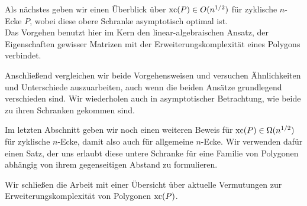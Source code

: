 Als nächstes geben wir einen Überblick über $\operatorname{xc}(P) \in O(n^{1/2})$ für zyklische $n$-Ecke $P$, wobei diese obere Schranke asymptotisch optimal ist.\\
Das Vorgehen benutzt hier im Kern den linear-algebraischen Ansatz, der Eigenschaften gewisser Matrizen mit der Erweiterungskomplexität eines Polygons verbindet. 

Anschließend vergleichen wir beide Vorgehensweisen und versuchen Ähnlichkeiten und Unterschiede auszuarbeiten, auch wenn die beiden Ansätze grundlegend verschieden sind. Wir wiederholen auch in asymptotischer Betrachtung, wie beide zu ihren Schranken gekommen sind.

Im letzten Abschnitt geben wir noch einen weiteren Beweis für $\operatorname{xc}(P) \in \Omega(n^{1/2})$ für zyklische $n$-Ecke, damit also auch für allgemeine $n$-Ecke. Wir verwenden dafür einen Satz, der uns erlaubt diese untere Schranke für eine Familie von Polygonen abhängig von ihrem gegenseitigen Abstand zu formulieren.

Wir schließen die Arbeit mit einer Übersicht über aktuelle Vermutungen zur Erweiterungskomplexität von Polygonen $\operatorname{xc}(P)$.

\newpage
